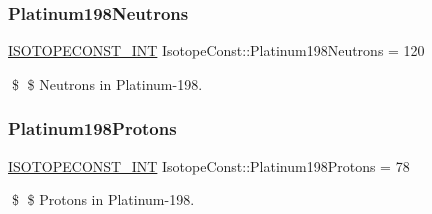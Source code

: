 \subsubsection{\texorpdfstring{Platinum198\+Neutrons}{Platinum198Neutrons}}
{\footnotesize\ttfamily \mbox{\hyperlink{group___isotope_const-_macros_ga5f18360b3e99483a35c32d789e62621c}{I\+S\+O\+T\+O\+P\+E\+C\+O\+N\+S\+T\+\_\+\+I\+NT}} Isotope\+Const\+::\+Platinum198\+Neutrons = 120}

\$ \$ Neutrons in Platinum-\/198. \mbox{\label{group___isotope_const-_platinum-_pt198_ga36df3ea63001d05d12ef7ef2a4c1ef12}} 
\subsubsection{\texorpdfstring{Platinum198\+Protons}{Platinum198Protons}}
{\footnotesize\ttfamily \mbox{\hyperlink{group___isotope_const-_macros_ga5f18360b3e99483a35c32d789e62621c}{I\+S\+O\+T\+O\+P\+E\+C\+O\+N\+S\+T\+\_\+\+I\+NT}} Isotope\+Const\+::\+Platinum198\+Protons = 78}

\$ \$ Protons in Platinum-\/198. 